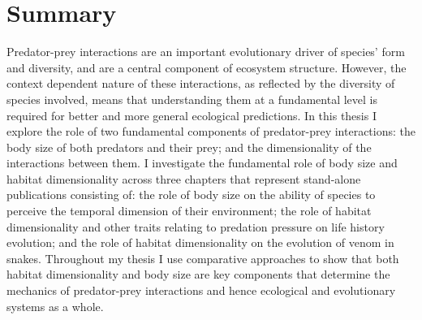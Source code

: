 \chapter*{Summary}

Predator-prey interactions are an important evolutionary driver of species' form and diversity, and are a central component of ecosystem structure. However, the context dependent nature of these interactions, as reflected by the diversity of species involved, means that understanding them at a fundamental level is required for better and more general ecological predictions. In this thesis I explore the role of two fundamental components of predator-prey interactions: the body size of both predators and their prey; and the dimensionality of the interactions between them. I investigate the fundamental role of body size and habitat dimensionality across three chapters that represent stand-alone publications consisting of: the role of body size on the ability of species to perceive the temporal dimension of their environment; the role of habitat dimensionality and other traits relating to predation pressure on life history evolution; and the role of habitat dimensionality on the evolution of venom in snakes. Throughout my thesis I use comparative approaches to show that both habitat dimensionality and body size are key components that determine the mechanics of predator-prey interactions and hence ecological and evolutionary systems as a whole.

